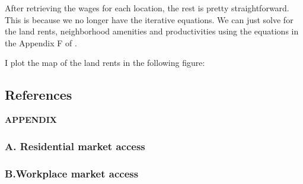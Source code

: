 \documentclass[
  11pt]{article}
\begin{document}
After retrieving the wages for each location, the rest is pretty
straightforward. This is because we no longer have the iterative
equations. We can just solve for the land rents, neighborhood amenities
and productivities using the equations in the Appendix F of
\citet{brinkman2024}.

I plot the map of the land rents in the following figure:

\clearpage

\subsection*{References}\label{references}

\renewcommand{\bibsection}{}


\clearpage

\label{appendix}
\bigskip

\begin{center}

{\large\bf APPENDIX}

\end{center}

\subsubsection*{A. Residential market
access}\label{a.-residential-market-access}



\clearpage

\subsubsection*{B.Workplace market
access}\label{b.workplace-market-access}


\end{document}
